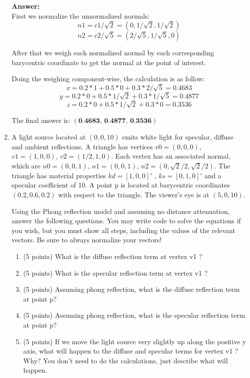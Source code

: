 \documentclass[12pt]{letter}
\begin{document}
\begin{enumerate}
	\textbf{Answer:} \\
	
	First we normalize the unnormalized normals:	
	$$n1 = c1 / \sqrt{2} = (0, 1/\sqrt{2}, 1/\sqrt{2})$$
	$$n2 = c2 / \sqrt{5} = (2/\sqrt{5}, 1/\sqrt{5}, 0)$$
	
	After that we weigh each normalized normal by each corresponding barycentric coordinate to get the normal at the point of interest.

	Doing the weighing component-wise, the calculation is as follow:
	$$ x = 0.2 * 1 + 0.5 * 0          + 0.3 * 2/\sqrt{5} = 0.4683 $$
	$$ y = 0.2 * 0 + 0.5 * 1/\sqrt{2} + 0.3 * 1/\sqrt{5} = 0.4877 $$
	$$ z = 0.2 * 0 + 0.5 * 1/\sqrt{2} + 0.3 * 0          = 0.3536 $$
	
	The final answer is: $(\textbf{0.4683, 0.4877, 0.3536})$

	\item
	A light source located at $(0, 0, 10)$ emits white light for specular, diffuse and ambient reflections.
	A triangle has vertices $v0 = (0, 0, 0)$, $v1 = (1, 0, 0)$, $v2 = (1/2, 1, 0)$. Each vertex has an associated normal,
	which are $n0 = (0, 0, 1)$, $n1 = (0, 0, 1)$, $n2 = (0, \sqrt{2}/2, \sqrt{2}/2)$.
	The triangle has material properties $kd = [1, 0, 0]'$ , $ks = [0, 1, 0]'$ and a specular coefficient of 10.
	A point p is located at barycentric coordinates $(0.2, 0.6, 0.2)$ with respect to the triangle.
	The viewer’s eye is at $(5, 0, 10)$.
	
	Using the Phong reflection model and assuming no distance attenuation, answer the following questions.
	You may write code to solve the equations if you wish, but you must show all steps, including the values of the relevant vectors.
	Be sure to always normalize your vectors!
	\begin{enumerate}
		\item (5 points) What is the diffuse reflection term at vertex v1 ?
		\item (5 points) What is the specular reflection term at vertex v1 ?
		\item (5 points) Assuming phong reflection, what is the diffuse reflection term at point p?
		\item (5 points) Assuming phong reflection, what is the specular reflection term at point p?
		\item (5 points) If we move the light source very slightly up along the positive y axis, what will happen to the diffuse and specular terms for vertex v1 ? Why? You don’t need to do the calculations, just describe what will happen.
	\end{enumerate}
	

\end{enumerate}
\end{document}
